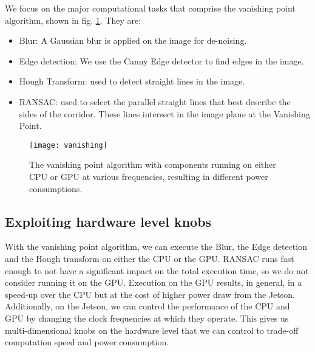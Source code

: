 We focus on the major computational tasks that comprise the vanishing point algorithm, shown in fig. \ref{fig:vanishing}.
They are:

\begin{itemize}
\item Blur: A Gaussian blur is applied on the image for de-noising.
\item Edge detection: We use the Canny Edge detector to find edges in the image.
\item Hough Transform: used to detect straight lines in the image.
\item RANSAC: used to select the parallel straight lines that best describe the sides of the corridor. These lines intersect in the image plane at the Vanishing Point.
\end{itemize}

\begin{figure}
	\centering
	\texttt{[image: vanishing]}
	\caption{The vanishing point algorithm with components running on either CPU or GPU at various frequencies, resulting in different power consumptions.}
	\label{fig:vanishing}		
\end{figure}
\subsection{Exploiting hardware level knobs}
With the vanishing point algorithm, we can execute the Blur, the Edge detection and the Hough transform on either the CPU or the GPU. 
RANSAC runs fast enough to not have a significant impact on the total execution time, so we do not consider running it on the GPU.
Execution on the GPU results, in general, in a speed-up over the CPU but at the cost of higher power draw from the Jetson. 
Additionally, on the Jetson, we can control the performance of the CPU and GPU by changing the clock frequencies at which they operate. 
This gives us multi-dimensional knobs on the hardware level that we can control to trade-off computation speed and power consumption.




